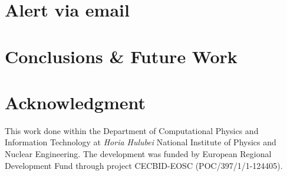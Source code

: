 \documentclass[conference]{IEEEtran}
\begin{document}
\section{Alert via email}
\label{section-email-alert}

\section{Conclusions \& Future Work}
\label{section-conclusions}


\section*{Acknowledgment}

This work done within the Department of Computational Physics and Information Technology at \emph{Horia Hulubei} National Institute of Physics and Nuclear Engineering. The development was funded by European Regional Development Fund through project CECBID-EOSC (POC/397/1/1-124405).



\end{document}

